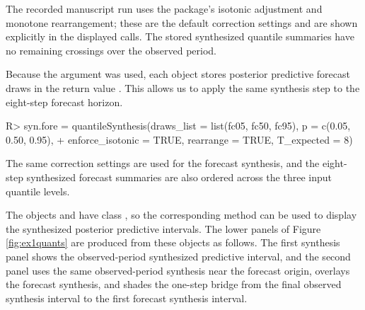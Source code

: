 \documentclass{jss}
\begin{document}
The recorded manuscript run uses the package's isotonic adjustment and monotone rearrangement; these are the default correction settings and are shown explicitly in the displayed calls. The stored synthesized quantile summaries have no remaining crossings over the observed period.

Because the argument  was used, each object stores posterior predictive forecast draws in the return value . This allows us to apply the same synthesis step to the eight-step forecast horizon.

\begin{CodeChunk}
\begin{CodeInput}
R> syn.fore = quantileSynthesis(draws_list = list(fc05, fc50, fc95), p = c(0.05, 0.50, 0.95),
+               enforce_isotonic = TRUE, rearrange = TRUE, T_expected = 8)
\end{CodeInput}
\end{CodeChunk}

The same correction settings are used for the forecast synthesis, and the eight-step synthesized forecast summaries are also ordered across the three input quantile levels.

The objects  and  have class , so the corresponding  method can be used to display the synthesized posterior predictive intervals. The lower panels of Figure \ref{fig:ex1quants} are produced from these objects as follows. The first synthesis panel shows the observed-period synthesized predictive interval, and the second panel uses the same observed-period synthesis near the forecast origin, overlays the forecast synthesis, and shades the one-step bridge from the final observed synthesis interval to the first forecast synthesis interval.
\end{document}
